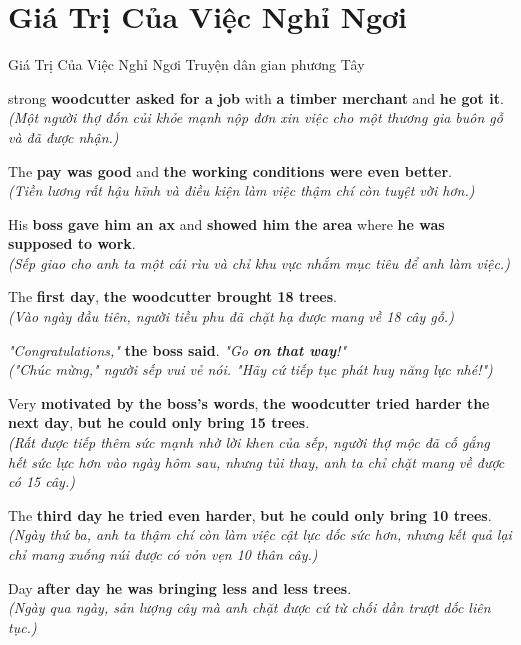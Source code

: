 \section{Giá Trị Của Việc Nghỉ Ngơi}
\begin{truyen}{Giá Trị Của Việc Nghỉ Ngơi}%
              {Truyện dân gian phương Tây}

 strong \textbf{woodcutter asked for a job} with \textbf{a timber merchant} and \textbf{he got it}.\\
\textit{(Một người thợ đốn củi khỏe mạnh nộp đơn xin việc cho một thương gia buôn gỗ và đã được nhận.)}

The \textbf{pay was good} and \textbf{the working conditions were even better}.\\
\textit{(Tiền lương rất hậu hĩnh và điều kiện làm việc thậm chí còn tuyệt vời hơn.)}

His \textbf{boss gave him an ax} and \textbf{showed him the area} where \textbf{he was supposed to work}.\\
\textit{(Sếp giao cho anh ta một cái rìu và chỉ khu vực nhắm mục tiêu để anh làm việc.)}

The \textbf{first day}, \textbf{the woodcutter brought 18 trees}.\\
\textit{(Vào ngày đầu tiên, người tiều phu đã chặt hạ được mang về 18 cây gỗ.)}

\textit{"Congratulations,"} \textbf{the boss said}. \textit{"Go \textbf{on that way}!"}\\
\textit{("Chúc mừng," người sếp vui vẻ nói. "Hãy cứ tiếp tục phát huy năng lực nhé!")}

Very \textbf{motivated by the boss's words}, \textbf{the woodcutter tried harder the next day}, \textbf{but he could only bring 15 trees}.\\
\textit{(Rất được tiếp thêm sức mạnh nhờ lời khen của sếp, người thợ mộc đã cố gắng hết sức lực hơn vào ngày hôm sau, nhưng tủi thay, anh ta chỉ chặt mang về được có 15 cây.)}

The \textbf{third day he tried even harder}, \textbf{but he could only bring 10 trees}.\\
\textit{(Ngày thứ ba, anh ta thậm chí còn làm việc cật lực dốc sức hơn, nhưng kết quả lại chỉ mang xuống núi được có vỏn vẹn 10 thân cây.)}

Day \textbf{after day he was bringing less and less trees}.\\
\textit{(Ngày qua ngày, sản lượng cây mà anh chặt được cứ từ chối dần trượt dốc liên tục.)}


\end{truyen}
